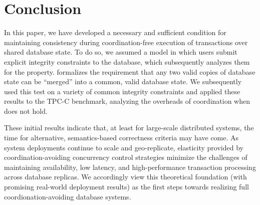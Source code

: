 
\section{Conclusion}
\label{sec:conclusion}

In this paper, we have developed a necessary and sufficient condition
for maintaining consistency during coordination-free execution of
transactions over shared database state. To do so, we assumed a model
in which users submit explicit integrity constraints to the database,
which subsequently analyzes them for the \iconfluence
property. \iconfluence formalizes the requirement that any two valid
copies of database state can be ``merged'' into a common, valid
database state. We subsequently used this test on a variety of common
integrity constraints and applied these results to the TPC-C
benchmark, analyzing the overheads of coordination when \iconfluence
does not hold.

These initial results indicate that, at least for large-scale
distributed systems, the time for alternative, semantics-based
correctness criteria may have come. As system deployments continue to
scale and geo-replicate, elasticity provided by coordination-avoiding
concurrency control strategies minimize the challenges of maintaining
availability, low latency, and high-performance transaction processing
across database replicas. We accordingly view this theoretical
foundation (with promising real-world deployment results) as the first
steps towards realizing full coordionation-avoiding database systems.
